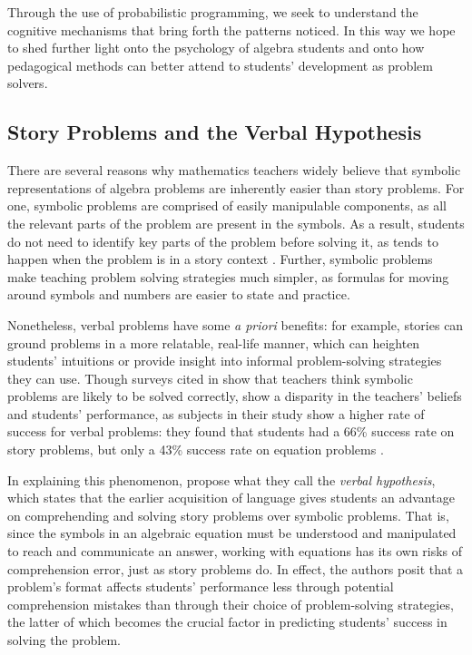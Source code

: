 \documentclass[10pt,letterpaper]{article}
\begin{document}
	Through the use of probabilistic programming, we seek to understand the cognitive mechanisms that bring forth the patterns  noticed. In this way we hope to shed further light onto the psychology of algebra students and onto how pedagogical methods can better attend to students' development as problem solvers.
	
	
	\subsection{Story Problems and the Verbal Hypothesis}
	
	There are several reasons why mathematics teachers widely believe that symbolic representations of algebra problems are inherently easier than story problems. For one, symbolic problems are comprised of easily manipulable components, as all the relevant parts of the problem are present in the symbols. As a result, students do not need to identify key parts of the problem before solving it, as tends to happen when the problem is in a story context \cite{KoedNath2004}. Further, symbolic problems make teaching problem solving strategies much simpler, as formulas for moving around symbols and numbers are easier to state and practice. 
	
	Nonetheless, verbal problems have some \textit{a priori} benefits: for example, stories can ground  problems in a more relatable, real-life manner, which can heighten students’ intuitions or provide insight into informal problem-solving strategies they can use. Though surveys cited in \cite{Nathan2012} show that teachers think symbolic problems are likely to be solved correctly,  show a disparity in the teachers' beliefs and students' performance, as subjects in their study show a higher rate of success for verbal problems: they found that students had a 66\% success rate on story problems, but only a 43\% success rate on equation problems \cite{KoedNath2004}.
	
	In explaining this phenomenon,  propose what they call the \textit{verbal hypothesis}, which states that the earlier acquisition of language gives students an advantage on comprehending and solving story problems over symbolic problems. That is, since the symbols in an algebraic equation must be understood and manipulated to reach and communicate an answer, working with equations has its own risks of comprehension error, just as story problems do. In effect, the authors posit that a problem's format affects students' performance less through potential comprehension mistakes than through their choice of problem-solving strategies, the latter of which becomes the crucial factor in predicting students' success in solving the problem.
	
\end{document}
